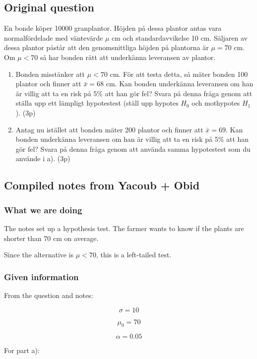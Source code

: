 \documentclass[10pt]{article}
\begin{document}
\subsection*{Original question}
En bonde köper 10000 granplantor.
Höjden på dessa plantor antas vara normalfördelade
med väntevärde \(\mu\) cm och standardavvikelse
10 cm.
Säljaren av dessa plantor påstår att den genomsnittliga
höjden på plantorna är \(\mu=70\) cm.
Om \(\mu<70\) så har bonden rätt att underkänna
leveransen av plantor.

\begin{enumerate}[label=\alph*)]
\item Bonden misstänker att \(\mu<70\) cm.
För att testa detta, så mäter bonden 100 plantor
och finner att \(\bar{x}=68\) cm.
Kan bonden underkänna leveransen om han är villig
att ta en risk på 5\% att han gör fel?
Svara på denna fråga genom att ställa upp ett
lämpligt hypotestest (ställ upp hypotes \(H_0\)
och mothypotes \(H_1\)).
\hfill (3p)

\item Antag nu istället att bonden mäter 200 plantor
och finner att \(\bar{x}=69\).
Kan bonden underkänna leveransen om han är villig
att ta en risk på 5\% att han gör fel?
Svara på denna fråga genom att använda samma
hypotestest som du använde i a).
\hfill (3p)
\end{enumerate}

\subsection*{Compiled notes from Yacoub + Obid}

\subsubsection*{What we are doing}
The notes set up a hypothesis test.
The farmer wants to know if the plants are shorter
than \(70\) cm on average.

Since the alternative is \(\mu<70\),
this is a left-tailed test.

\subsubsection*{Given information}
From the question and notes:

\[
\sigma=10
\]

\[
\mu_0=70
\]

\[
\alpha=0.05
\]

For part a):
\end{document}
